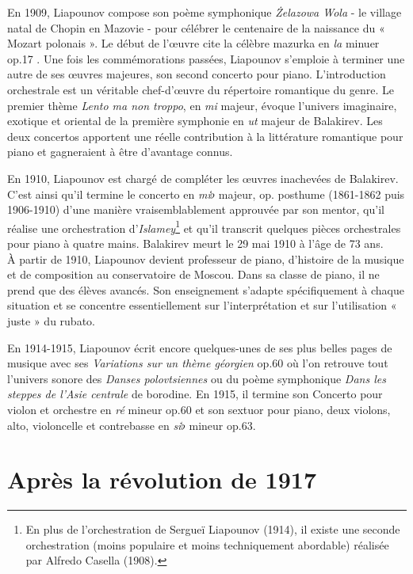 En 1909, Liapounov compose son poème symphonique \emph{Żelazowa Wola} - le village natal de Chopin en Mazovie - pour célébrer le centenaire de la naissance du « Mozart polonais ». Le début de l'œuvre cite la célèbre mazurka en \emph{la} minuer op.17 . Une fois les commémorations passées, Liapounov s'emploie à terminer une autre de ses œuvres majeures, son second concerto pour piano. L'introduction orchestrale est un véritable chef-d'œuvre du répertoire romantique du genre. Le premier thème \emph{Lento ma non troppo}, en \emph{mi} majeur, évoque l'univers imaginaire, exotique et oriental de la première symphonie en \emph{ut} majeur de Balakirev. Les deux concertos apportent une réelle contribution à la littérature romantique pour piano et gagneraient à être d'avantage connus.

En 1910, Liapounov est chargé de compléter les œuvres inachevées de Balakirev. C'est ainsi qu'il termine le concerto en \emph{mi}$\flat$ majeur, op. posthume (1861-1862 puis 1906-1910) d'une manière vraisemblablement approuvée par son mentor, qu'il réalise une orchestration d'\emph{Islamey}\footnote{En plus de l'orchestration de Sergueï Liapounov (1914), il existe une seconde orchestration (moins populaire et moins techniquement abordable) réalisée par Alfredo Casella (1908).} et qu'il transcrit quelques pièces orchestrales pour piano à quatre mains. Balakirev meurt le 29 mai 1910 à l'âge de 73 ans.\\

À partir de 1910, Liapounov devient professeur de piano, d'histoire de la musique et de composition au conservatoire de Moscou. Dans sa classe de piano, il ne prend que des élèves avancés. Son enseignement s'adapte spécifiquement à chaque situation et se concentre essentiellement sur l'interprétation et sur l'utilisation « juste » du rubato.

\newpage

En 1914-1915, Liapounov écrit encore quelques-unes de ses plus belles pages de musique avec ses \emph{Variations sur un thème géorgien} op.60 où l'on retrouve tout l'univers sonore des \emph{Danses polovtsiennes} ou du poème symphonique \emph{Dans les steppes de l'Asie centrale} de borodine. En 1915, il termine son Concerto pour violon et orchestre en \emph{ré} mineur op.60 et son sextuor pour piano, deux violons, alto, violoncelle et contrebasse en \emph{si}$\flat$ mineur op.63.\\

\section{Après la révolution de 1917}

